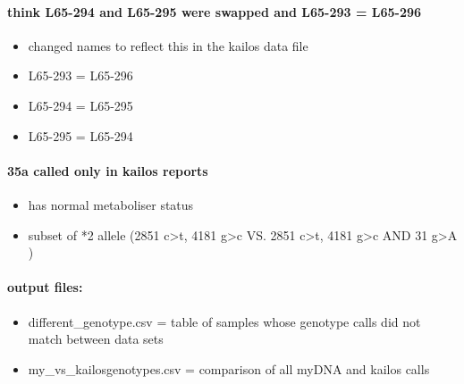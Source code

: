 \documentclass[]{article}
\providecommand{\tightlist}{%
  \setlength{\itemsep}{0pt}\setlength{\parskip}{0pt}}
\let\oldparagraph\paragraph
\renewcommand{\paragraph}[1]{\oldparagraph{#1}\mbox{}}
\begin{document}
\paragraph{think L65-294 and L65-295 were swapped and L65-293 =
L65-296}\label{think-l65-294-and-l65-295-were-swapped-and-l65-293-l65-296}

\begin{itemize}
\tightlist
\item
  changed names to reflect this in the kailos data file
\item
  L65-293 = L65-296
\item
  L65-294 = L65-295
\item
  L65-295 = L65-294
\end{itemize}

\paragraph{35a called only in kailos
reports}\label{a-called-only-in-kailos-reports}

\begin{itemize}
\tightlist
\item
  has normal metaboliser status
\item
  subset of *2 allele (2851 c\textgreater{}t, 4181 g\textgreater{}c VS.
  2851 c\textgreater{}t, 4181 g\textgreater{}c AND 31 g\textgreater{}A )
\end{itemize}

\paragraph{output files:}\label{output-files-3}

\begin{itemize}
\tightlist
\item
  different\_genotype.csv = table of samples whose genotype calls did
  not match between data sets
\item
  my\_vs\_kailosgenotypes.csv = comparison of all myDNA and kailos calls
\end{itemize}
\end{document}
